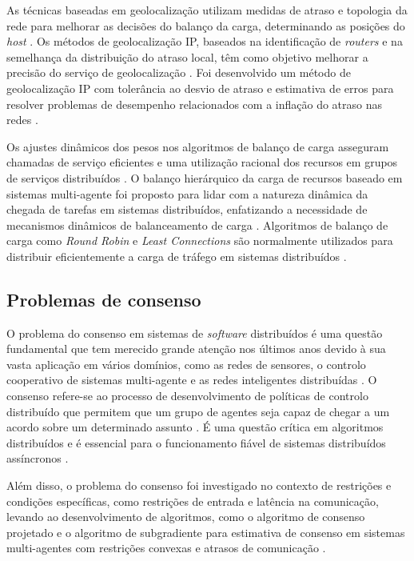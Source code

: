 As técnicas baseadas em geolocalização utilizam medidas de atraso e topologia da rede para melhorar 
as decisões do balanço da carga, determinando as posições do \textit{host} \cite{lb2016b}. Os 
métodos de geolocalização IP, baseados na identificação de \textit{routers} e na semelhança da 
distribuição do atraso local, têm como objetivo melhorar a precisão do serviço de geolocalização
\cite{lb2006}. Foi desenvolvido um método de geolocalização IP com tolerância ao desvio de atraso 
e estimativa de erros para resolver problemas de desempenho relacionados com a inflação do atraso 
nas redes \cite{lb2018}.

Os ajustes dinâmicos dos pesos nos algoritmos de balanço de carga asseguram chamadas de serviço 
eficientes e uma utilização racional dos recursos em grupos de serviços distribuídos \cite{lb2022}.
O balanço hierárquico da carga de recursos baseado em sistemas multi-agente foi proposto para 
lidar com a natureza dinâmica da chegada de tarefas em sistemas distribuídos, enfatizando a 
necessidade de mecanismos dinâmicos de balanceamento de carga \cite{lb2018b}. Algoritmos de 
balanço de carga como \textit{Round Robin} e \textit{Least Connections} são normalmente utilizados 
para distribuir eficientemente a carga de tráfego em sistemas distribuídos \cite{lb2010}.

\subsection{Problemas de consenso}

O problema do consenso em sistemas de \textit{software} distribuídos é uma questão fundamental que 
tem merecido grande atenção nos últimos anos devido à sua vasta aplicação em vários domínios, como
as redes de sensores, o controlo cooperativo de sistemas multi-agente e as redes inteligentes 
distribuídas \cite{consensus2020}. O consenso refere-se ao processo de desenvolvimento de políticas 
de controlo distribuído que permitem que um grupo de agentes seja capaz de chegar a um acordo sobre 
um determinado assunto \cite{consensus2013}. É uma questão crítica em algoritmos distribuídos e é
essencial para o funcionamento fiável de sistemas distribuídos assíncronos \cite{consesus2016} 
\cite{consensus2011}.

Além disso, o problema do consenso foi investigado no contexto de restrições e condições
específicas, como restrições de entrada e latência na comunicação, levando ao desenvolvimento de
algoritmos, como o algoritmo de consenso projetado e o algoritmo de subgradiente para estimativa 
de consenso em sistemas multi-agentes com restrições convexas e atrasos de comunicação 
\cite{consensus2018}.

